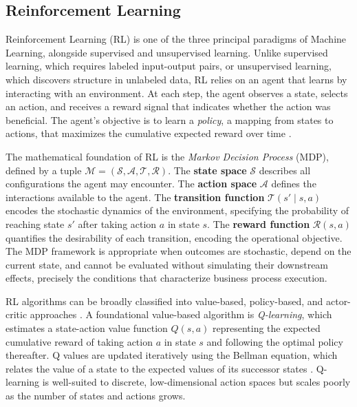 \documentclass[journal,onecolumn]{IEEEtran}
\begin{document}
\subsection{Reinforcement Learning}
\label{subsec:rl}

Reinforcement Learning (RL) is one of the three principal paradigms of
Machine Learning, alongside supervised and unsupervised learning. Unlike
supervised learning, which requires labeled input-output pairs, or
unsupervised learning, which discovers structure in unlabeled data, RL relies
on an agent that learns by interacting with an environment. At each step, the
agent observes a state, selects an action, and receives a reward signal that
indicates whether the action was beneficial. The agent's objective is to learn
a \emph{policy}, a mapping from states to actions, that maximizes the
cumulative expected reward over time \cite{sutton_2018_rl_intro}.

The mathematical foundation of RL is the \emph{Markov Decision Process}
(MDP), defined by a tuple $\mathcal{M} = (\mathcal{S}, \mathcal{A},
\mathcal{T}, \mathcal{R})$. The \textbf{state space} $\mathcal{S}$ describes
all configurations the agent may encounter. The \textbf{action space}
$\mathcal{A}$ defines the interactions available to the agent. The
\textbf{transition function} $\mathcal{T}(s' \mid s, a)$ encodes the
stochastic dynamics of the environment, specifying the probability of
reaching state $s'$ after taking action $a$ in state $s$. The \textbf{reward
function} $\mathcal{R}(s, a)$ quantifies the desirability of each transition,
encoding the operational objective. The MDP framework is appropriate when
outcomes are stochastic, depend on the current state, and cannot be evaluated
without simulating their downstream effects, precisely the conditions that
characterize business process execution.

RL algorithms can be broadly classified into value-based, policy-based, and
actor-critic approaches \cite{Optimizing_Resource_Allocation_Policies}. A
foundational value-based algorithm is \emph{Q-learning}, which estimates a
state-action value function $Q(s, a)$ representing the expected cumulative
reward of taking action $a$ in state $s$ and following the optimal policy
thereafter. Q values are updated iteratively using the Bellman equation,
which relates the value of a state to the expected values of its successor
states \cite{sutton_2018_rl_intro}. Q-learning is well-suited to discrete,
low-dimensional action spaces but scales poorly as the number of states and
actions grows.
\end{document}
